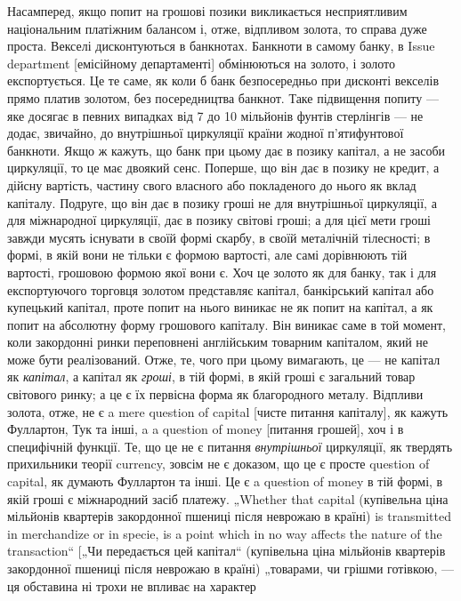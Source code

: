 Насамперед, якщо попит на грошові позики викликається несприятливим
національним платіжним балансом і, отже, відпливом
золота, то справа дуже проста. Векселі дисконтуються в банкнотах.
Банкноти в самому банку, в Issue department [емісійному
департаменті] обмінюються на золото, і золото експортується.
Це те саме, як коли б банк безпосередньо при дисконті
векселів прямо платив золотом, без посередництва банкнот. Таке
підвищення попиту — яке досягає в певних випадках від 7 до
10 мільйонів фунтів стерлінгів — не додає, звичайно, до внутрішньої
циркуляції країни жодної п’ятифунтової банкноти. Якщо ж
кажуть, що банк при цьому дає в позику капітал, а не засоби
циркуляції, то це має двоякий сенс. Поперше, що він дає в позику
не кредит, а дійсну вартість, частину свого власного або
покладеного до нього як вклад капіталу. Подруге, що він дає
в позику гроші не для внутрішньої циркуляції, а для міжнародної
циркуляції, дає в позику світові гроші; а для цієї мети гроші
завжди мусять існувати в своїй формі скарбу, в своїй металічній
тілесності; в формі, в якій вони не тільки є формою вартості, але
самі дорівнюють тій вартості, грошовою формою якої вони є. Хоч
це золото як для банку, так і для експортуючого торговця золотом
представляє капітал, банкірський капітал або купецький капітал,
проте попит на нього виникає не як попит на капітал, а як попит
на абсолютну форму грошового капіталу. Він виникає саме в той
момент, коли закордонні ринки переповнені англійським товарним
капіталом, який не може бути реалізований. Отже, те, чого при
цьому вимагають, це — не капітал як \emph{капітал}, а капітал як \emph{гроші}, в
тій формі, в якій гроші є загальний товар світового ринку; а це є їх
первісна форма як благородного металу. Відпливи золота, отже,
не є a mere question of capital [чисте питання капіталу], як кажуть
Фуллартон, Тук та інші, a a question of money [питання грошей],
хоч і в специфічній функції. Те, що це не є питання
\emph{внутрішньої} циркуляції, як твердять прихильники теорії currency,
зовсім не є доказом, що це є просте question of capital, як думають
Фуллартон та інші. Це є a question of money в тій формі, в якій
гроші є міжнародний засіб платежу. „Whether that capital (купівельна
ціна мільйонів квартерів закордонної пшениці після
неврожаю в країні) is transmitted in merchandize or in specie, is
a point which in no way affects the nature of the transaction“ [„Чи
передається цей капітал“ (купівельна ціна мільйонів квартерів
закордонної пшениці після неврожаю в країні) „товарами, чи
грішми готівкою, — ця обставина ні трохи не впливає на характер
